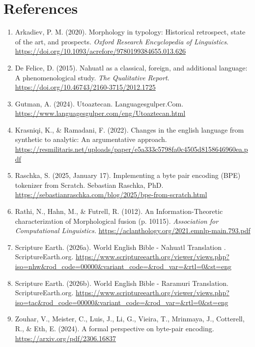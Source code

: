 \documentclass[11pt]{article}
\begin{document}
\newpage

\section{References}

\begin{enumerate}
    \item Arkadiev, P. M. (2020). Morphology in typology: Historical retrospect, state of the art, and prospects. \textit{Oxford Research Encyclopedia of Linguistics}. \url{https://doi.org/10.1093/acrefore/9780199384655.013.626}

    \item De Felice, D. (2015). Nahuatl as a classical, foreign, and additional language: A phenomenological study. \textit{The Qualitative Report}. \url{https://doi.org/10.46743/2160-3715/2012.1725}

    \item Gutman, A. (2024). Utoaztecan. Languagesgulper.Com. \url{https://www.languagesgulper.com/eng/Utoaztecan.html}

    \item Krasniqi, K., \& Ramadani, F. (2022). Changes in the english language from synthetic to analytic: An argumentative approach. \url{https://resmilitaris.net/uploads/paper/e5a333c5798fa0c4505d8158646960ea.pdf}

    \item Raschka, S. (2025, January 17). Implementing a byte pair encoding (BPE) tokenizer from Scratch. Sebastian Raschka, PhD. \url{https://sebastianraschka.com/blog/2025/bpe-from-scratch.html}

    \item Rathi, N., Hahn, M., \& Futrell, R. (1012). An Information-Theoretic characterization of Morphological fusion (p. 10115). \textit{Association for Computational Linguistics.} \url{https://aclanthology.org/2021.emnlp-main.793.pdf}

    \item Scripture Earth. (2026a). World English Bible - Nahuatl Translation . ScriptureEarth.org. \url{https://www.scriptureearth.org/viewer/views.php?iso=nhw\&rod\_code=00000&variant\_code=\&rod\_var=\&rtl=0\&st=eng}

    \item Scripture Earth. (2026b). World English Bible - Raramuri Translation. ScriptureEarth.org. \url{https://www.scriptureearth.org/viewer/views.php?iso=tac\&rod\_code=00000&variant\_code=&rod\_var=\&rtl=0\&st=eng}

    \item Zouhar, V., Meister, C., Luis, J., Li, G., Vieira, T., Mrinmaya, J., Cotterell, R., \& Eth, E. (2024). A formal perspective on byte-pair encoding. \url{https://arxiv.org/pdf/2306.16837}

\end{enumerate}
\end{document}

